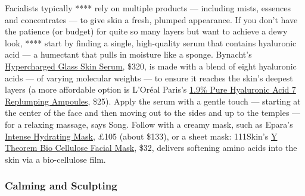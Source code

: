 Facialists typically **** rely on multiple products --- including mists,
essences and concentrates --- to give skin a fresh, plumped appearance.
If you don't have the patience (or budget) for quite so many layers but
want to achieve a dewy look, **** start by finding a single,
high-quality serum that contains hyaluronic acid --- a humectant that
pulls in moisture like a sponge. Bynacht's
\href{https://shen-beauty.com/collections/bynacht/products/hypercharged-glass-skin-serum}{Hypercharged
Glass Skin Serum}, \$320, is made with a blend of eight hyaluronic acids
--- of varying molecular weights --- to ensure it reaches the skin's
deepest layers (a more affordable option is L'Oréal Paris's
\href{https://www.lorealparisusa.com/products/skin-care/products/face-serums/revitalift-derm-intensives-1-9-pure-hyaluronic-acid-7-replumping-ampoules.aspx?shade=revitalift-derm-intensives-1-9-pure-hyaluronic-acid-7-replumping-ampoules}{1.9\%
Pure Hyaluronic Acid 7 Replumping Ampoules}, \$25). Apply the serum with
a gentle touch --- starting at the center of the face and then moving
out to the sides and up to the temples --- for a relaxing massage, says
Song. Follow with a creamy mask, such as Epara's
\href{https://www.eparaskincare.com/products/intense-hydrating-mask}{Intense
Hydrating Mask}, £105 (about \$133), or a sheet mask: 111Skin's
\href{https://111skin.com/collections/face-masks/products/y-theorem-bio-cellulose-facial-mask?variant=31977084715093}{Y
Theorem Bio Cellulose Facial Mask}, \$32, delivers softening amino acids
into the skin via a bio-cellulose film.

\hypertarget{calming-and-sculpting}{%
\subsubsection{\texorpdfstring{\textbf{Calming and
Sculpting}}{Calming and Sculpting}}\label{calming-and-sculpting}}

